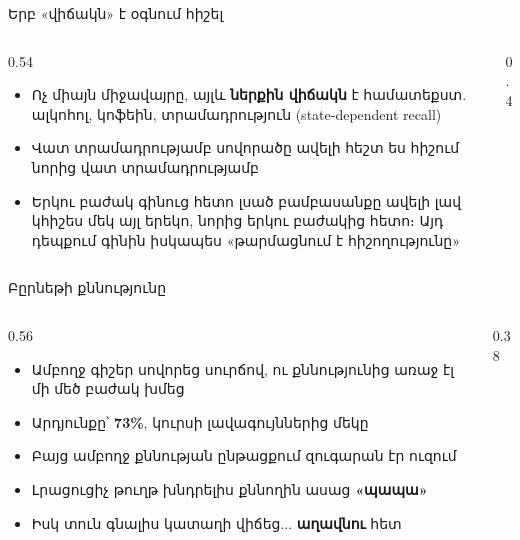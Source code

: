 \begin{frame}{Երբ «վիճակն» է օգնում հիշել}
  \begin{columns}[T]
    \begin{column}{0.54\textwidth}
      \begin{itemize}
        \item Ոչ միայն միջավայրը, այլև \textbf{ներքին վիճակն} է համատեքստ. ալկոհոլ, կոֆեին, տրամադրություն (state-dependent recall)
        \item<2-> Վատ տրամադրությամբ սովորածը ավելի հեշտ ես հիշում նորից վատ տրամադրությամբ
        \item<3-> Երկու բաժակ գինուց հետո լսած բամբասանքը ավելի լավ կհիշես մեկ այլ երեկո, նորից երկու բաժակից հետո։ Այդ դեպքում գինին իսկապես «թարմացնում է հիշողությունը»
      \end{itemize}
    \end{column}
    \begin{column}{0.4\textwidth}
    \end{column}
  \end{columns}
\end{frame}

\begin{frame}{Բըրնեթի քննությունը}
  \begin{columns}[c]
    \begin{column}{0.56\textwidth}
      \begin{itemize}
        \item Ամբողջ գիշեր սովորեց սուրճով, ու քննությունից առաջ էլ մի մեծ բաժակ խմեց 
        \item<2-> Արդյունքը՝ \textbf{73\%}, կուրսի լավագույններից մեկը
        \item<3-> Բայց ամբողջ քննության ընթացքում զուգարան էր ուզում
        \item<4-> Լրացուցիչ թուղթ խնդրելիս քննողին ասաց \textbf{«պապա»}
        \item<5-> Իսկ տուն գնալիս կատաղի վիճեց... \textbf{աղավնու} հետ 
      \end{itemize}
    \end{column}
    \begin{column}{0.38\textwidth}
      \centering
      \par\medskip
    \end{column}
  \end{columns}
\end{frame}

